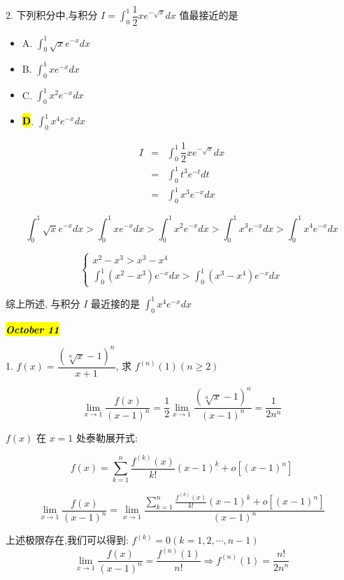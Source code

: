 2. 下列积分中,与积分 $\displaystyle{I=\int_{0}^{1}\dfrac{1}{2}xe^{-\sqrt{x}}dx}$ 值最接近的是
\begin{itemize}
	\item A. $\int_{0}^{1}\sqrt{x}e^{-x}dx$
	\item B. $\int_{0}^{1}xe^{-x}dx$
	\item C. $\int_{0}^{1}x^2e^{-x}dx$
	\item \hl{\textbf{D}}. $\int_{0}^{1}x^4e^{-x}dx$
\end{itemize}
\begin{solution}
	\begin{eqnarray*}
		I & = & \int_{0}^{1}\dfrac{1}{2}xe^{-\sqrt{x}}dx\\
		  & = & \int_{0}^{1}t^3e^{-t}dt\\
		  & = & \int_{0}^{1}x^3e^{-x}dx
	\end{eqnarray*}
	  
	$$\int_{0}^{1}\sqrt{x}e^{-x}dx>\int_{0}^{1}xe^{-x}dx>\int_{0}^{1}x^{2}e^{-x}dx>\int_{0}^{1}x^{3}e^{-x}dx>\int_{0}^{1}x^{4}e^{-x}dx$$
	
	$$\begin{cases}
		x^{2} - x^{3} > x^{3} - x^{4}\\
		\displaystyle{\int_{0}^{1}(x^{2}-x^{3})e^{-x}dx > \int_{0}^{1}(x^{3}-x^{4})e^{-x}dx}
	\end{cases}$$
	
	综上所述, 与积分 $I$ 最近接的是 $\displaystyle{\int_{0}^{1}x^{4}e^{-x}dx}$
\end{solution}

\hl{\textbf{\textit{October 11}}}

1. $f(x)=\dfrac{\left(\sqrt[n]{x}-1\right) ^n}{x+1}$, 求 $f^{(n)}(1)(n\geq 2)$
\begin{solution}

	$$\lim\limits_{x\rightarrow 1}\dfrac{f(x)}{(x-1)^n}=\dfrac{1}{2}\lim\limits_{x\rightarrow 1}\dfrac{(\sqrt[n]{x}-1)^n}{(x-1)^n}=\dfrac{1}{2n^{n}}$$
	
	$f(x)$ 在 $x = 1$ 处泰勒展开式:

	$$f(x) = \sum\limits_{k=1}^{n}\dfrac{f^{(k)}(x)}{k!}(x-1)^{k} + o[(x-1)^{n}]$$ 

	$$\lim\limits_{x\rightarrow 1}\dfrac{f(x)}{(x-1)^n}=\lim\limits_{x\rightarrow 1}\dfrac{\sum\limits_{k=1}^{n}\frac{f^{(k)}(x)}{k!}(x-1)^k+o[(x-1)^n]}{(x-1)^n}$$
	
	上述极限存在,我们可以得到:  $f^{(k)}=0(k=1,2,\cdots,n-1)$
	$$\lim\limits_{x\rightarrow 1}\dfrac{f(x)}{(x-1)^n}=\dfrac{f^{(n)}(1)}{n!}\Rightarrow f^{(n)}(1)=\dfrac{n!}{2n^{n}}$$
\end{solution}

